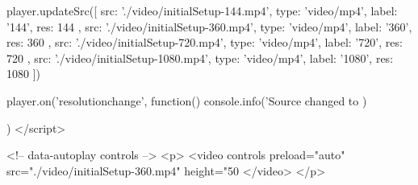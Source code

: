 \begin{frame}[fragile,label=ScreenCastVideoJSSetup]
\begin{presentationMode}
\begin{htmlonly}
\begin{rawhtml}
{      player.updateSrc([
        {
          src: './video/initialSetup-144.mp4',
          type: 'video/mp4',
          label: '144',
          res: 144
        },
        {
          src: './video/initialSetup-360.mp4',
          type: 'video/mp4',
          label: '360',
          res: 360
        },
        {
          src: './video/initialSetup-720.mp4',
          type: 'video/mp4',
          label: '720',
          res: 720
        },
        {
          src: './video/initialSetup-1080.mp4',
          type: 'video/mp4',
          label: '1080',
          res: 1080
        }
      ])

      player.on('resolutionchange', function(){
        console.info('Source changed to %
      })

    })
  </script>

  \end{rawhtml}
\end{htmlonly}
\end{presentationMode}

\begin{articleMode}
\begin{htmlonly}
  \begin{rawhtml}
      <!-- data-autoplay  controls -->
    <p>
    <video  controls   preload="auto"  src="./video/initialSetup-360.mp4"  height="50%
    </video>
    </p>
  \end{rawhtml}
\end{htmlonly}
\end{articleMode}



\end{frame}





\begin{comment}
*****  [[elisp:(org-cycle)][| ]]  [[elisp:(blee:ppmm:org-mode-toggle)][Nat]] [[elisp:(beginning-of-buffer)][Top]] [[elisp:(delete-other-windows)][(1)]] || /Frame/ *Label=VidoJsScreenCastSetup*  VidoJs ScreenCast Setup ::  [[elisp:(org-cycle)][| ]]
\end{comment}

